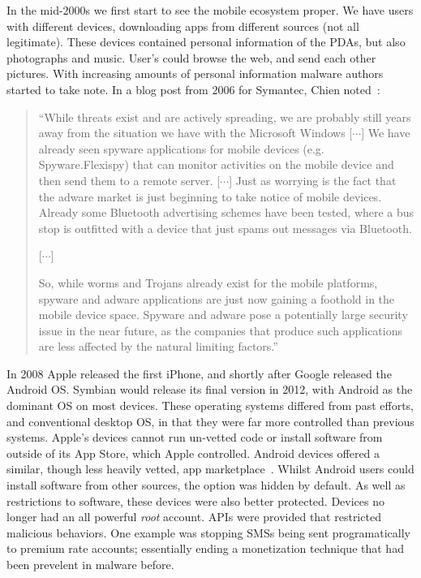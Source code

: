 \documentclass[thesis.tex]{subfiles}
\begin{document}
In the mid-2000s we first start to see the mobile
ecosystem proper.  We have users with different devices, downloading
apps from different sources (not all legitimate).  These devices
contained personal information of the \acp{PDA}, but also photographs
and music.  User's could browse the web, and send each other pictures.
With increasing amounts of personal information malware authors
started to take note.  In a blog post from 2006 for Symantec, Chien
noted~\cite{eric_chien_spyware_2006}:

\begin{quote}
  ``While threats exist and are actively spreading, we are probably
  still years away from the situation we have with the Microsoft Windows
  [$\cdots$] We have already seen spyware applications for mobile devices
  (e.g. Spyware.Flexispy) that can monitor activities on the mobile
  device and then send them to a remote server. [$\cdots$] Just as
  worrying is the fact that the adware market is just beginning to take
  notice of mobile devices. Already some Bluetooth advertising schemes
  have been tested, where a bus stop is outfitted with a device that
  just spams out messages via Bluetooth.

  [$\cdots$]
  
  So, while worms and Trojans already exist for the mobile
  platforms, spyware and adware applications are just now gaining a
  foothold in the mobile device space. Spyware and adware pose a
  potentially large security issue in the near future, as the companies
  that produce such applications are less affected by the natural
  limiting factors.''
\end{quote}

In 2008 Apple released the first iPhone, and shortly after Google
released the Android OS.  Symbian would release its final version in
2012, with Android as the dominant OS on most devices.  These
operating systems differed from past efforts, and conventional desktop
OS, in that they were far more controlled than previous systems.
Apple's devices cannot run un-vetted code or install software from
outside of its App Store, which Apple controlled.  Android devices
offered a similar, though less heavily vetted, app
marketplace~\cite{oberheide_dissecting_2012}. Whilst Android users
could install software from other sources, the option was hidden by
default.  As well as restrictions to software, these devices were also
better protected.  Devices no longer had an all powerful \emph{root}
account.  APIs were provided that restricted malicious behaviors.
One example was stopping SMSs being sent programatically to premium
rate accounts; essentially ending a monetization technique that had
been prevelent in malware before.
\end{document}

